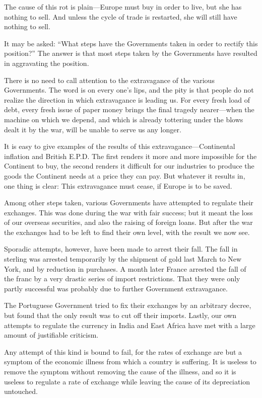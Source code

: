 \documentclass{book}
\begin{document}
The cause of this rot is plain—Europe must buy in order to live, but she has nothing to sell. And unless the cycle of trade is restarted, she will still have nothing to sell.

It may be asked: “What steps have the Governments taken in order to rectify this position?” The answer is that most steps taken by the Governments have resulted in aggravating the position.

There is no need to call attention to the extravagance of the various Governments. The word is on every one’s lips, and the pity is that people do not realize the direction in which extravagance is leading us. For every fresh load of debt, every fresh issue of paper money brings the final tragedy nearer—when the machine on which we depend, and which is already tottering under the blows dealt it by the war, will be unable to serve us any longer.

It is easy to give examples of the results of this extravagance—Continental inflation and British E.P.D. The first renders it more and more impossible for the Continent to buy, the second renders it difficult for our industries to produce the goods the Continent needs at a price they can pay. But whatever it results in, one thing is clear: This extravagance must cease, if Europe is to be saved.

Among other steps taken, various Governments have attempted to regulate their exchanges. This was done during the war with fair success; but it meant the loss of our overseas securities, and also the raising of foreign loans. But after the war the exchanges had to be left to find their own level, with the result we now see.

Sporadic attempts, however, have been made to arrest their fall. The fall in sterling was arrested temporarily by the shipment of gold last March to New York, and by reduction in purchases. A month later France arrested the fall of the franc by a very drastic series of import restrictions. That they were only partly successful was probably due to further Government extravagance.

The Portuguese Government tried to fix their exchanges by an arbitrary decree, but found that the only result was to cut off their imports. Lastly, our own attempts to regulate the currency in India and East Africa have met with a large amount of justifiable criticism.

Any attempt of this kind is bound to fail, for the rates of exchange are but a symptom of the economic illness from which a country is suffering. It is useless to remove the symptom without removing the cause of the illness, and so it is useless to regulate a rate of exchange while leaving the cause of its depreciation untouched.
\end{document}
